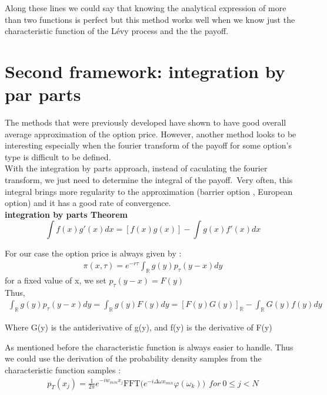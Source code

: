 \documentclass[12pt]{report}
\begin{document}
 Along these lines we could say that knowing the analytical expression of  more than two functions is perfect but this method works well when we know just the characteristic function of the Lévy process and the the payoff.  
\section{Second framework: integration by par parts }

The methods that were previously developed have shown to have good overall average approximation of the option price. However, another method looks to be interesting especially when the fourier transform of the payoff for some option's type is difficult to be  defined.\\
With the integration by parts approach, instead of caculating the fourier transform, we just need to  determine the integral of the payoff.~Very often, this integral brings more regularity to the approximation (barrier option , European option) and it has a good rate of convergence.\\

\textbf{ integration by parts Theorem }
\begin{equation*}
\int f(x) g'(x) dx =  [f(x) g(x)] - \int g(x) f'(x)  dx 
\end{equation*}

For our case the option price is always given by :
\begin{gather*}
\pi(x, \tau)=e^{-r\tau} \int_{\mathbb{R}}g(y)p_{\tau}(y-x)dy 
\end{gather*}
for a fixed value of x, we set $p_{\tau}(y-x)=F(y) $\\
Thus, 
\begin{gather*}
\int_{\mathbb{R}}g(y)p_{\tau}(y-x)dy =\int_{\mathbb{R}}g(y)F(y)dy=[F(y) G(y)]_{\mathbb{R}} - \int_{\mathbb{R}} G(y) f(y)  dy
\end{gather*}

Where G(y) is the antiderivative of g(y), and f(y) is the derivative of F(y)

As mentioned before the characteristic function is always easier to handle.  Thus we could use the derivation of the probability density samples from the characteristic function samples :
\begin{gather}
p_T(x_j)=\frac{1}{2 \pi} e^{- iw_{min} x_j} \text{FFT}\big ( e^{-i \Delta\omega x_{min} } \varphi(\omega_k) \big) ~~for~ 0 \leqslant j < N
\end{gather}
\end{document}

